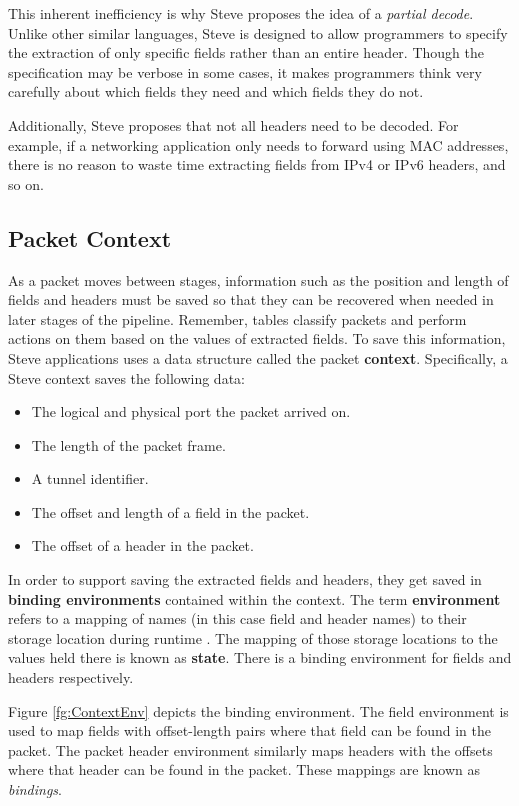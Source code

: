 This inherent inefficiency is why Steve proposes the idea of a \textit{partial decode}. Unlike other similar languages, Steve is designed to allow programmers to specify the extraction of only specific fields rather than an entire header. Though the specification may be verbose in some cases, it makes programmers think very carefully about which fields they need and which fields they do not.

Additionally, Steve proposes that not all headers need to be decoded. For example, if a networking application only needs to forward using MAC addresses, there is no reason to waste time extracting fields from IPv4 or IPv6 headers, and so on.

\subsection{Packet Context}

As a packet moves between stages, information such as the position and length of fields and headers must be saved so that they can be recovered when needed in later stages of the pipeline. Remember, tables classify packets and perform actions on them based on the values of extracted fields. To save this information, Steve applications uses a data structure called the packet \textbf{context}. Specifically, a Steve context saves the following data:

\begin{itemize}
\item The logical and physical port the packet arrived on.
\item The length of the packet frame.
\item A tunnel identifier.
\item The offset and length of a field in the packet.
\item The offset of a header in the packet.
\end{itemize}

In order to support saving the extracted fields and headers, they get saved in \textbf{binding environments} contained within the context. The term \textbf{environment} refers to a mapping of names (in this case field and header names) to their storage location during runtime \cite{compilers1}. The mapping of those storage locations to the values held there is known as \textbf{state}. There is a binding environment for fields and headers respectively.

Figure \ref{fg:ContextEnv} depicts the binding environment. The field environment is used to map fields with offset-length pairs where that field can be found in the packet. The packet header environment similarly maps headers with the offsets where that header can be found in the packet. These mappings are known as \textit{bindings}.

